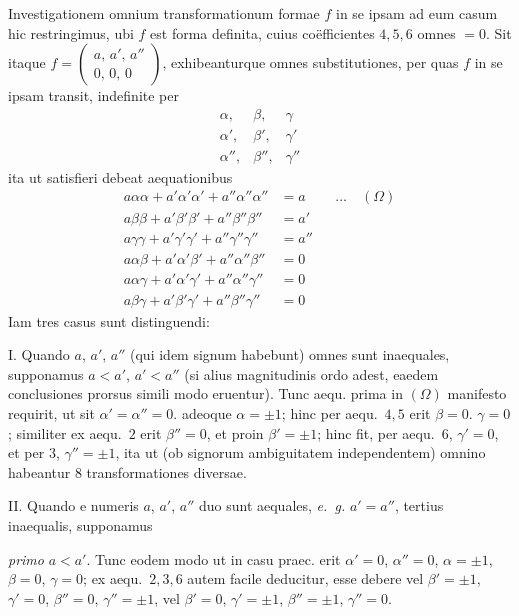 Investigationem omnium transformationum formae $f$ in se ipsam ad eum casum hic restringimus, ubi $f$ est forma definita, cuius coëfficientes $4,5,6$ omnes $=0$. Sit itaque $f=\left(\begin{smallmatrix}a,\,a',\,a''\\0,\,0,\,0\end{smallmatrix}\right)$, exhibeanturque omnes substitutiones, per quas $f$ in se ipsam transit, indefinite per
\[
\begin{array}{ccc}
\alpha,&\beta,&\gamma\\
\alpha',&\beta',&\gamma'\\
\alpha'',&\beta'',&\gamma''
\end{array}
\]
ita ut satisfieri debeat aequationibus
\[
\begin{aligned}
a\alpha\alpha+a'\alpha'\alpha'+a''\alpha''\alpha''&=a&&\ldots\quad(\Omega)\\
a\beta\beta+a'\beta'\beta'+a''\beta''\beta''&=a'\\
a\gamma\gamma+a'\gamma'\gamma'+a''\gamma''\gamma''&=a''\\
a\alpha\beta+a'\alpha'\beta'+a''\alpha''\beta''&=0\\
a\alpha\gamma+a'\alpha'\gamma'+a''\alpha''\gamma''&=0\\
a\beta\gamma+a'\beta'\gamma'+a''\beta''\gamma''&=0
\end{aligned}
\]
Iam tres casus sunt distinguendi:

I. Quando $a$, $a'$, $a''$ (qui idem signum habebunt) omnes sunt inaequales, supponamus $a<a'$, $a'<a''$ (si alius magnitudinis ordo adest, eaedem conclusiones prorsus simili modo eruentur). Tunc aequ. prima in $(\Omega)$ manifesto requirit, ut sit $\alpha'=\alpha''=0$. adeoque $\alpha=\pm1$; hinc per aequ.~$4,5$ erit $\beta=0$. $\gamma=0$; similiter ex aequ.~$2$ erit $\beta''=0$, et proin $\beta'=\pm1$; hinc fit, per aequ.~$6$, $\gamma'=0$, et per $3$, $\gamma''=\pm1$, ita ut (ob signorum ambiguitatem independentem) omnino habeantur $8$ transformationes diversae.

II. Quando e numeris $a$, $a'$, $a''$ duo sunt aequales, \textit{e.~g.} $a'=a''$, tertius inaequalis, supponamus

\textit{primo} $a<a'$. Tunc eodem modo ut in casu praec. erit $\alpha'=0$, $\alpha''=0$, $\alpha=\pm1$, $\beta=0$, $\gamma=0$; ex aequ.~$2,3,6$ autem facile deducitur, esse debere
vel $\beta'=\pm1$, $\gamma'=0$, $\beta''=0$, $\gamma''=\pm1$, vel $\beta'=0$, $\gamma'=\pm1$, $\beta''=\pm1$, $\gamma''=0$.

